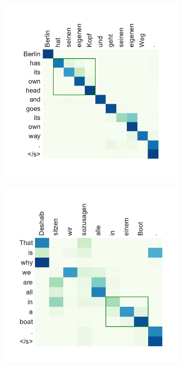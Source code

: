  \begin{figure}[ht!]
\centering
\begin{subfigure}[h]{0.495\textwidth}
\includegraphics[width=\linewidth]{06-research-04/figs/idiomexam2.pdf}
\end{subfigure}
\begin{subfigure}[h]{0.495\textwidth}
\includegraphics[width=\linewidth]{06-research-04/figs/idiomexam3.pdf}

\end{subfigure}
\end{figure}
